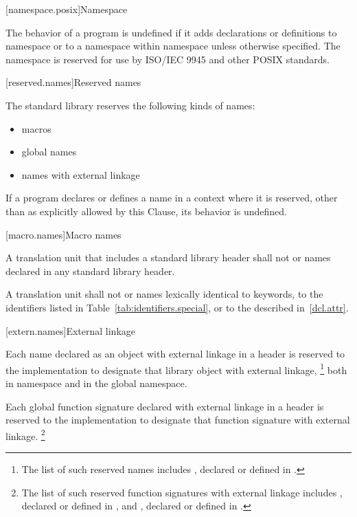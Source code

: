[namespace.posix]{Namespace }

\pnum
The behavior of a \Cpp program is undefined if it adds declarations or definitions to namespace
or to a namespace within namespace
unless otherwise specified. The namespace  is reserved for use by
ISO/IEC 9945 and other POSIX standards.

[reserved.names]{Reserved names}%

\pnum
The \Cpp standard library reserves the following kinds of names:
\begin{itemize}
\item macros
\item global names
\item names with external linkage
\end{itemize}

\pnum
If a program declares or defines a name in a context where it is
reserved, other than as explicitly allowed by this Clause, its behavior is
undefined.%

[macro.names]{Macro names}

\pnum
{}%
%
A translation unit that includes a standard library header shall not
 or  names declared in any standard
library header.

\pnum
{}%
A translation unit shall not  or 
names lexically identical to keywords, to the identifiers listed in
Table~\ref{tab:identifiers.special}, or to the  described
in~\ref{dcl.attr}.

[extern.names]{External linkage}

\pnum
Each name declared as an object with external linkage
%
in a header is reserved to the implementation to designate that library
object with external linkage,%
\footnote{The list of such reserved names includes
,
declared or defined in
%
%
.}
both in namespace
and in the global namespace.

\pnum
Each
%
global function signature declared with
%
external linkage in a header is reserved to the
implementation to designate that function signature with
%
external linkage.
\footnote{The list of such reserved function
signatures with external linkage includes
%
,
declared or defined in
%
,
and
%
%
,
declared or defined in
%
.}

